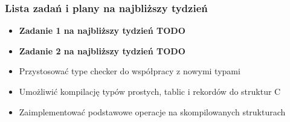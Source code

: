 \documentclass{beamer}
\begin{document}
	\begin{frame}
		\frametitle{Lista zadań i plany na najbliższy tydzień}
		\begin{itemize}
			\item{\textbf{Zadanie 1 na najbliższy tydzień TODO}}
			\item{\textbf{Zadanie 2 na najbliższy tydzień TODO}}
			\item{Przystosować type checker do współpracy z nowymi typami}
			\item{Umożliwić kompilację typów prostych, tablic i rekordów do struktur C}
			\item{Zaimplementować podstawowe operacje na skompilowanych strukturach}
		\end{itemize}
	\end{frame}
\end{document}
